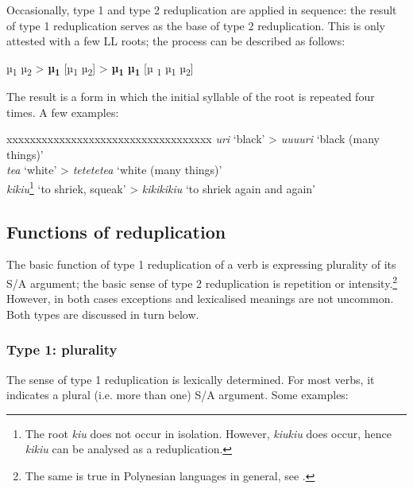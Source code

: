 Occasionally, type 1 and type 2 reduplication are applied in sequence: the result of type 1 reduplication serves as the base of type 2 reduplication. This is only attested with a few LL roots; the process can be described as follows:

\ea
  µ\textsubscript{1} µ\textsubscript{2} > \textbf{µ}\textbf{\textsubscript{1}} [µ\textsubscript{1} µ\textsubscript{2}] > \textbf{µ}\textbf{\textsubscript{1}} \textbf{µ}\textbf{\textsubscript{1}} [µ\textsubscript{ 1} µ\textsubscript{1} µ\textsubscript{2}]
\z

The result is a form in which the initial syllable of the root is repeated four times. A few examples:

\ea
\begin{tabbing}
 xxxxxxxxxxxxxxxxxxxxxxxxxxxxxxxxxxx \kill
\textit{{\ꞌ}uri} ‘black’ > \textit{{\ꞌ}u{\ꞌ}u{\ꞌ}u{\ꞌ}uri} ‘black (many things)’\\
  \textit{tea} ‘white’ > \textit{tetetetea} ‘white (many things)’\\
  \textit{kikiu}\footnote{\label{fn:80}The root \textit{kiu} does not occur in isolation. However, \textit{kiukiu} does occur, hence \textit{kikiu} can be analysed as a reduplication.} ‘to shriek, squeak’ > \textit{kikikikiu} ‘to shriek again and again’
\end{tabbing}
\z 
\subsection{Functions of reduplication}\label{sec:2.6.2}
The basic function of type 1 reduplication of a verb is expressing plurality of its S/A argument; the basic sense of type 2 reduplication is repetition or intensity.\footnote{\label{fn:81}The same is true in Polynesian languages in general, see \citet{Finney1999}.} However, in both cases exceptions and lexicalised meanings are not uncommon. Both types are discussed in turn below.

\subsubsection[Type 1: plurality]{Type 1: plurality}\label{sec:2.6.2.1}

The sense of type 1 reduplication is lexically determined. For most verbs, it indicates a plural (i.e. more than one) S/A argument. Some examples:


